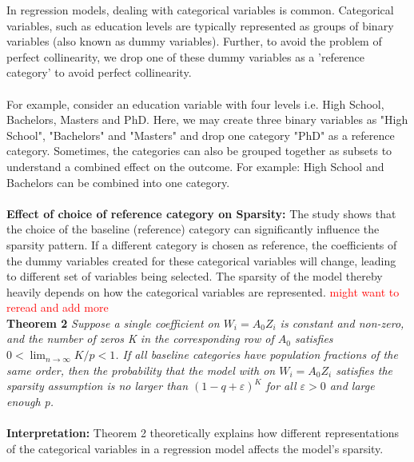 In regression models, dealing with categorical variables is common. Categorical variables, such as education levels are typically represented as groups of binary variables (also known as dummy variables). Further, to avoid the problem of perfect collinearity, we drop one of these dummy variables as a 'reference category' to avoid perfect collinearity. \\
\\
For example, consider an education variable with four levels i.e. High School, Bachelors, Masters and PhD. Here, we may create three binary variables as "High School", "Bachelors" and "Masters" and drop one category "PhD" as a reference category. Sometimes, the categories can also be grouped together as subsets to understand a combined effect on the outcome. For example: High School and Bachelors can be combined into one category.\\
\\
\textbf{Effect of choice of reference category on Sparsity:}
The study shows that the choice of the baseline (reference) category can significantly influence the sparsity pattern. If a different category is chosen as reference, the coefficients of the dummy variables created for these categorical variables will change, leading to different set of variables being selected. The sparsity of the model thereby heavily depends on how the categorical variables are represented. \textcolor{red}{might want to reread and add more}
\\

\textbf{Theorem 2} 
\textit{Suppose a single coefficient on $W_i = A_0 Z_i$  is constant and non-zero, and the number of zeros K in the corresponding row of $A_0$ satisfies $0<\lim _{n \rightarrow \infty} K / p<1$. If all baseline categories have population fractions of the same order, then the probability that the model with on $W_i = A_0 Z_i$ satisfies the sparsity assumption is no larger than $(1-q+\varepsilon)^K$ for all $\varepsilon>0$ and large enough p.}\\
\\
\textbf{Interpretation:} Theorem 2 theoretically explains how different representations of the categorical variables in a regression model affects the model's sparsity.\\ 

